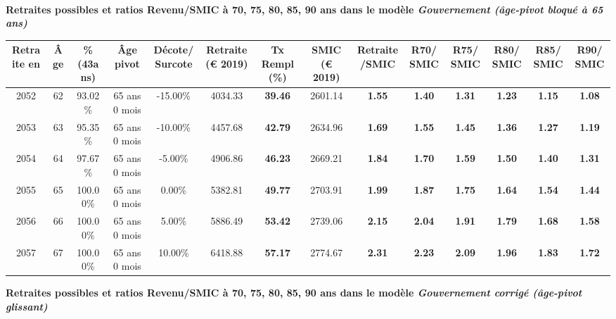  ~\\{\bf \noindent Retraites possibles et ratios Revenu/SMIC à 70, 75, 80, 85, 90 ans dans le modèle \emph{Gouvernement (âge-pivot bloqué à 65 ans)}}  
 
\begin{adjustbox}{max width=\textwidth} 
\begin{tabular}[htb]{|c|c||c|c|c||c|c||c|c||c|c|c|c|c|} 
\hline 
 Retraite en &  Âge &  \%(43ans) &  Âge pivot &  Décote/Surcote &  Retraite (\euro{} 2019) &  Tx Rempl(\%) &  SMIC (\euro{} 2019) &  Retraite/SMIC &  R70/SMIC &  R75/SMIC &  R80/SMIC &  R85/SMIC &  R90/SMIC \\ 
\hline \hline 
 2052 &  62 &  93.02\% &  65 ans 0 mois &  -15.00\% &  4034.33 &  {\bf 39.46} &  2601.14 &  {\bf 1.55} &  {\bf 1.40} &  {\bf 1.31} &  {\bf 1.23} &  {\bf 1.15} &  {\bf 1.08} \\ 
\hline 
 2053 &  63 &  95.35\% &  65 ans 0 mois &  -10.00\% &  4457.68 &  {\bf 42.79} &  2634.96 &  {\bf 1.69} &  {\bf 1.55} &  {\bf 1.45} &  {\bf 1.36} &  {\bf 1.27} &  {\bf 1.19} \\ 
\hline 
 2054 &  64 &  97.67\% &  65 ans 0 mois &  -5.00\% &  4906.86 &  {\bf 46.23} &  2669.21 &  {\bf 1.84} &  {\bf 1.70} &  {\bf 1.59} &  {\bf 1.50} &  {\bf 1.40} &  {\bf 1.31} \\ 
\hline 
 2055 &  65 &  100.00\% &  65 ans 0 mois &  0.00\% &  5382.81 &  {\bf 49.77} &  2703.91 &  {\bf 1.99} &  {\bf 1.87} &  {\bf 1.75} &  {\bf 1.64} &  {\bf 1.54} &  {\bf 1.44} \\ 
\hline 
 2056 &  66 &  100.00\% &  65 ans 0 mois &  5.00\% &  5886.49 &  {\bf 53.42} &  2739.06 &  {\bf 2.15} &  {\bf 2.04} &  {\bf 1.91} &  {\bf 1.79} &  {\bf 1.68} &  {\bf 1.58} \\ 
\hline 
 2057 &  67 &  100.00\% &  65 ans 0 mois &  10.00\% &  6418.88 &  {\bf 57.17} &  2774.67 &  {\bf 2.31} &  {\bf 2.23} &  {\bf 2.09} &  {\bf 1.96} &  {\bf 1.83} &  {\bf 1.72} \\ 
\hline 
\hline 
\end{tabular} 
\end{adjustbox} 
 
 \vspace{0.1cm} 
{\bf \noindent Retraites possibles et ratios Revenu/SMIC à 70, 75, 80, 85, 90 ans dans le modèle \emph{Gouvernement corrigé (âge-pivot glissant)}}  
 
